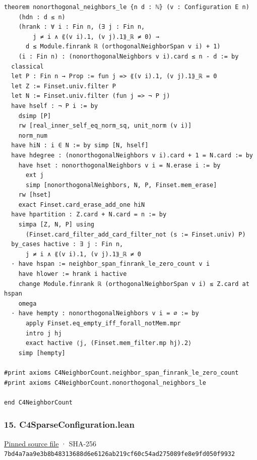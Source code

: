 \documentclass[11pt,a4paper]{article}
\begin{document}
\begin{Verbatim}[breaklines,breakanywhere,fontsize=\footnotesize]
theorem nonorthogonal_neighbors_le {n d : ℕ} (v : Configuration E n)
    (hdn : d ≤ n)
    (hrank : ∀ i : Fin n, (∃ j : Fin n,
        j ≠ i ∧ ⟪(v i).1, (v j).1⟫_ℝ ≠ 0) →
      d ≤ Module.finrank ℝ (orthogonalNeighborSpan v i) + 1)
    (i : Fin n) : (nonorthogonalNeighbors v i).card ≤ n - d := by
  classical
  let P : Fin n → Prop := fun j => ⟪(v i).1, (v j).1⟫_ℝ = 0
  let Z := Finset.univ.filter P
  let N := Finset.univ.filter (fun j => ¬ P j)
  have hself : ¬ P i := by
    dsimp [P]
    rw [real_inner_self_eq_norm_sq, unit_norm (v i)]
    norm_num
  have hiN : i ∈ N := by simp [N, hself]
  have hdegree : (nonorthogonalNeighbors v i).card + 1 = N.card := by
    have hset : nonorthogonalNeighbors v i = N.erase i := by
      ext j
      simp [nonorthogonalNeighbors, N, P, Finset.mem_erase]
    rw [hset]
    exact Finset.card_erase_add_one hiN
  have hpartition : Z.card + N.card = n := by
    simpa [Z, N, P] using
      (Finset.card_filter_add_card_filter_not (s := Finset.univ) P)
  by_cases hactive : ∃ j : Fin n,
      j ≠ i ∧ ⟪(v i).1, (v j).1⟫_ℝ ≠ 0
  · have hspan := neighbor_span_finrank_le_zero_count v i
    have hlower := hrank i hactive
    change Module.finrank ℝ (orthogonalNeighborSpan v i) ≤ Z.card at hspan
    omega
  · have hempty : nonorthogonalNeighbors v i = ∅ := by
      apply Finset.eq_empty_iff_forall_notMem.mpr
      intro j hj
      exact hactive ⟨j, (Finset.mem_filter.mp hj).2⟩
    simp [hempty]

#print axioms C4NeighborCount.neighbor_span_finrank_le_zero_count
#print axioms C4NeighborCount.nonorthogonal_neighbors_le

end C4NeighborCount
\end{Verbatim}

\subsubsection{15. C4SparseConfiguration.lean}\label{c4sparseconfiguration.lean}

\href{https://github.com/mpelteshki/climbing-to-the-frontier/blob/29fbb70da18564048f62492e43870f2f96a65463/cagent/p1/C4SparseConfiguration.lean}{Pinned source file} · SHA-256 \texttt{7bd4a7aa\allowbreak{}9e3b8b48\allowbreak{}313688d6\allowbreak{}e6126ab2\allowbreak{}19cf60c5\allowbreak{}4ad27508\allowbreak{}9fe8e9fd\allowbreak{}050f9932}
\end{document}
